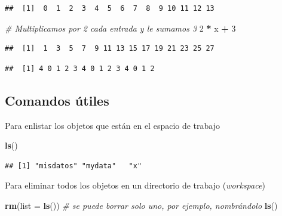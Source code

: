 \documentclass[]{article}
\newenvironment{Shaded}{\begin{snugshade}}{\end{snugshade}}
\newcommand{\KeywordTok}[1]{\textcolor[rgb]{0.13,0.29,0.53}{\textbf{#1}}}
\newcommand{\DataTypeTok}[1]{\textcolor[rgb]{0.13,0.29,0.53}{#1}}
\newcommand{\DecValTok}[1]{\textcolor[rgb]{0.00,0.00,0.81}{#1}}
\newcommand{\StringTok}[1]{\textcolor[rgb]{0.31,0.60,0.02}{#1}}
\newcommand{\CommentTok}[1]{\textcolor[rgb]{0.56,0.35,0.01}{\textit{#1}}}
\newcommand{\OperatorTok}[1]{\textcolor[rgb]{0.81,0.36,0.00}{\textbf{#1}}}
\newcommand{\NormalTok}[1]{#1}
\begin{document}
\begin{verbatim}
##  [1]  0  1  2  3  4  5  6  7  8  9 10 11 12 13
\end{verbatim}

\begin{Shaded}
\begin{Highlighting}[]
\CommentTok{# Multiplicamos por 2 cada entrada y le sumamos 3}
\DecValTok{2} \OperatorTok{*}\StringTok{ }\NormalTok{x }\OperatorTok{+}\StringTok{ }\DecValTok{3}
\end{Highlighting}
\end{Shaded}

\begin{verbatim}
##  [1]  1  3  5  7  9 11 13 15 17 19 21 23 25 27
\end{verbatim}

\begin{Shaded}
\end{Shaded}

\begin{verbatim}
##  [1] 4 0 1 2 3 4 0 1 2 3 4 0 1 2
\end{verbatim}

\subsection{Comandos útiles}\label{comandos-utiles}

Para enlistar los objetos que están en el espacio de trabajo

\begin{Shaded}
\begin{Highlighting}[]
\KeywordTok{ls}\NormalTok{()}
\end{Highlighting}
\end{Shaded}

\begin{verbatim}
## [1] "misdatos" "mydata"   "x"
\end{verbatim}

Para eliminar todos los objetos en un directorio de trabajo
(\emph{workspace})

\begin{Shaded}
\begin{Highlighting}[]
\KeywordTok{rm}\NormalTok{(}\DataTypeTok{list =} \KeywordTok{ls}\NormalTok{()) }\CommentTok{# se puede borrar solo uno, por ejemplo, nombrándolo}
\KeywordTok{ls}\NormalTok{()}
\end{Highlighting}
\end{Shaded}
\end{document}
